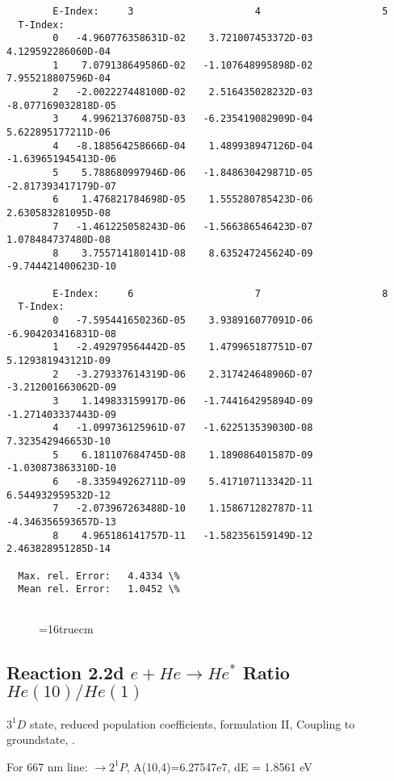 \documentclass[12pt,dvipdfmx]{article}
\begin{document}
{\begin{small}
\begin{verbatim}
        E-Index:     3                     4                     5
  T-Index:
        0   -4.960776358631D-02    3.721007453372D-03    4.129592286060D-04
        1    7.079138649586D-02   -1.107648995898D-02    7.955218807596D-04
        2   -2.002227448100D-02    2.516435028232D-03   -8.077169032818D-05
        3    4.996213760875D-03   -6.235419082909D-04    5.622895177211D-06
        4   -8.188564258666D-04    1.489938947126D-04   -1.639651945413D-06
        5    5.788680997946D-06   -1.848630429871D-05   -2.817393417179D-07
        6    1.476821784698D-05    1.555280785423D-06    2.630583281095D-08
        7   -1.461225058243D-06   -1.566386546423D-07    1.078484737480D-08
        8    3.755714180141D-08    8.635247245624D-09   -9.744421400623D-10

        E-Index:     6                     7                     8
  T-Index:
        0   -7.595441650236D-05    3.938916077091D-06   -6.904203416831D-08
        1   -2.492979564442D-05    1.479965187751D-07    5.129381943121D-09
        2   -3.279337614319D-06    2.317424648906D-07   -3.212001663062D-09
        3    1.149833159917D-06   -1.744164295894D-09   -1.271403337443D-09
        4   -1.099736125961D-07   -1.622513539030D-08    7.323542946653D-10
        5    6.181107684745D-08    1.189086401587D-09   -1.030873863310D-10
        6   -8.335949262711D-09    5.417107113342D-11    6.544932959532D-12
        7   -2.073967263488D-10    1.158671282787D-11   -4.346356593657D-13
        8    4.965186141757D-11   -1.582356159149D-12    2.463828951285D-14

  Max. rel. Error:   4.4334 \%
  Mean rel. Error:   1.0452 \%


\end{verbatim}\end{small}
\begin{figure} \label{2.2c}
\epsfxsize=16truecm
\end{figure}
\newpage


\subsection{
  Reaction 2.2d $e + He \rightarrow He^*  $ Ratio $He(10)/He(1)$
}

  $3^1D$ state,
  reduced population coefficients, formulation II,
  Coupling to groundstate, \cite{kn:Fujimoto}.

  For 667 nm line: $\rightarrow 2^1P$, A(10,4)=6.27547e7, dE = 1.8561 eV

\begin{small}\begin{verbatim}



\end{verbatim}
\end{small}}
\end{document}

